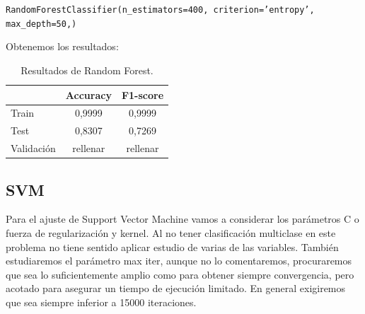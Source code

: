 \documentclass[11pt,a4paper]{article}
\begin{document}
{\begin{center}
    \texttt{RandomForestClassifier(n\_estimators=400, criterion='entropy', max\_depth=50,)}\end{center}}
    
Obtenemos los resultados:

\begin{table}[h]
\begin{center}
\begin{tabular}{|l|c|c|}
\hline
  & Accuracy & F1-score \\ \hline
Train  & 0,9999 & 0,9999 \\
  Test & 0,8307 & 0,7269  \\
  Validación & rellenar & rellenar  \\\hline
\end{tabular}
\caption{Resultados de Random Forest.}
\end{center}
\end{table}

\newpage
\subsection{SVM}

Para el ajuste de Support Vector Machine vamos a considerar los parámetros C o fuerza de regularización y kernel. Al no tener clasificación multiclase en este problema no tiene sentido aplicar estudio de varias de las variables. También estudiaremos el parámetro max iter, aunque no lo comentaremos, procuraremos que sea lo suficientemente amplio como para obtener siempre convergencia, pero acotado para asegurar un tiempo de ejecución limitado. En general exigiremos que sea siempre inferior a 15000 iteraciones.
\end{document}
